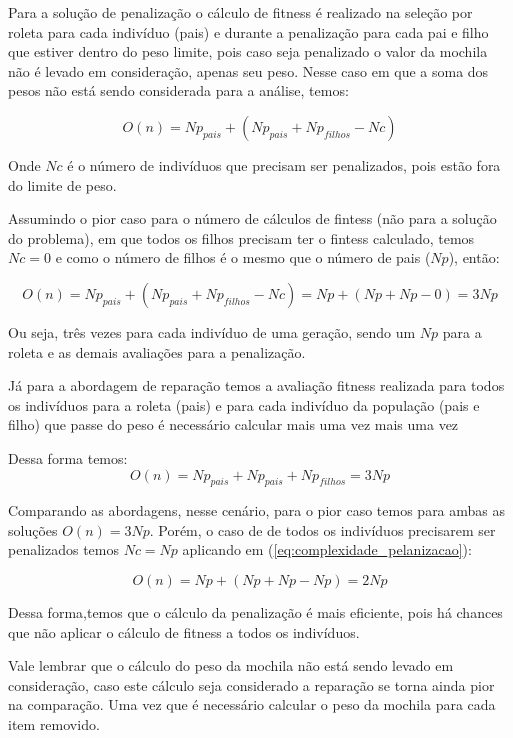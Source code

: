 \documentclass[11pt]{article}
\begin{document}
Para a solução de penalização o cálculo de fitness é realizado na seleção por roleta para cada indivíduo (pais) e durante a penalização para cada pai e filho que estiver dentro do peso limite, pois caso seja penalizado o valor da mochila não é levado em consideração, apenas seu peso. Nesse caso em que a soma dos pesos não está sendo considerada para a análise, temos:

\begin{equation} \label{eq:complexidade_pelanizacao}
	O(n) = Np_{pais} + (Np_{pais} + Np_{filhos} - Nc)
\end{equation}

Onde $Nc$ é o número de indivíduos que precisam ser penalizados, pois estão fora do limite de peso. 

Assumindo o pior caso para o número de cálculos de fintess (não para a solução do problema), em que todos os filhos precisam ter o fintess calculado, temos $Nc = 0 $ e como o número de filhos é o mesmo que o número de pais ($Np$), então:

\begin{equation} \label{eq:complexidade_pelanizacao_pior_caso}
	O(n) = Np_{pais} + (Np_{pais} + Np_{filhos} - Nc) = Np + (Np + Np - 0) = 3Np
\end{equation}

Ou seja, três vezes para cada indivíduo de uma geração, sendo um $Np$ para a roleta e as demais avaliações para a penalização.

Já para a abordagem de reparação temos a avaliação fitness realizada para todos os indivíduos para a roleta (pais) e para cada indivíduo da população (pais e filho) que passe do peso é necessário calcular mais uma vez mais uma vez

Dessa forma temos:
\begin{equation} \label{eq:complexidade_reparacao}
	O(n) = Np_{pais} + Np_{pais} + Np_{filhos} = 3Np
\end{equation}

Comparando as abordagens, nesse cenário, para o pior caso temos para ambas as soluções $O(n) = 3Np$. Porém, o caso de de todos os indivíduos precisarem ser penalizados temos $Nc = Np$ aplicando em (\ref{eq:complexidade_pelanizacao}):

\begin{equation} \label{eq:complexidade_pelanizacao_pior_caso}
	O(n) = Np + (Np + Np - Np) = 2Np
\end{equation}

Dessa forma,temos que o cálculo da penalização é mais eficiente, pois há chances que não aplicar o cálculo de fitness a todos os indivíduos.

Vale lembrar que o cálculo do peso da mochila não está sendo levado em consideração, caso este cálculo seja considerado a reparação se torna ainda pior na comparação. Uma vez que é necessário calcular o peso da mochila para cada item removido.
\end{document}
